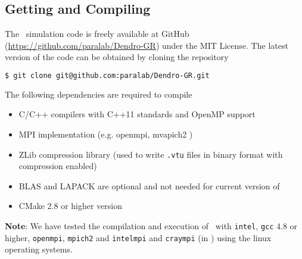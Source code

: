\subsection{Getting and Compiling \dendro~}

The \dendro\ simulation code is freely available at GitHub (\href{https://github.com/paralab/Dendro-GR}{https://github.com/paralab/Dendro-GR}) under the MIT License. 
The latest version of the code can be obtained by cloning the repository
\begin{lstlisting}[basicstyle=\small,language=bash]
$ git clone git@github.com:paralab/Dendro-GR.git
\end{lstlisting}

The following dependencies are required to compile \dendro~
\begin{itemize}
	\item C/C++ compilers with C++11 standards and OpenMP support
	\item MPI implementation (e.g. openmpi, mvapich2 )
	\item ZLib compression library (used to write \texttt{.vtu} files in binary format with compression enabled)
	\item BLAS and LAPACK are optional and not needed for current version of \dendro~
	\item CMake 2.8 or higher version
\end{itemize}

\textbf{Note}: We have tested the compilation and execution of \dendro\ with \texttt{intel}, \texttt{gcc} 4.8 or higher, \texttt{openmpi}, \texttt{mpich2} and \texttt{intelmpi} and \texttt{craympi} (in \Titan) using the linux operating systems. 


